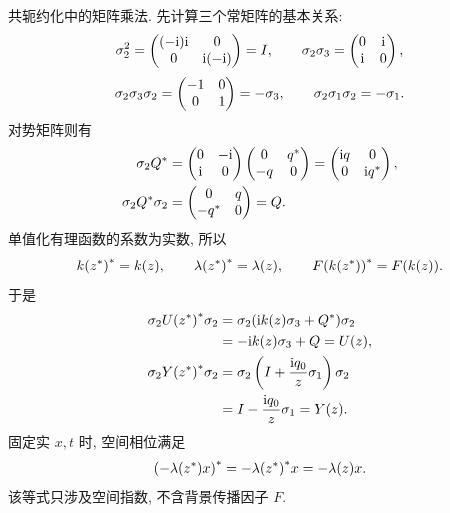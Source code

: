 \par\medskip\noindent 共轭约化中的矩阵乘法.\quad
先计算三个常矩阵的基本关系:
\begin{equation*}
\sigma_2^2
=\begin{pmatrix}(-\mathrm{i})\mathrm{i}&0\\0&\mathrm{i}(-\mathrm{i})\end{pmatrix}=I,
\qquad
\sigma_2\sigma_3
=\begin{pmatrix}0&\mathrm{i}\\\mathrm{i}&0\end{pmatrix},
\end{equation*}
\begin{equation*}
\sigma_2\sigma_3\sigma_2
=\begin{pmatrix}-1&0\\0&1\end{pmatrix}=-\sigma_3,
\qquad
\sigma_2\sigma_1\sigma_2=-\sigma_1.
\end{equation*}
对势矩阵则有
\begin{align*}
\sigma_2{Q}^{*}
&=\begin{pmatrix}0&-\mathrm{i}\\\mathrm{i}&0\end{pmatrix}
\begin{pmatrix}0&{q}^{*}\\-q&0\end{pmatrix}
=\begin{pmatrix}\mathrm{i} q&0\\0&\mathrm{i}{q}^{*}\end{pmatrix},\\
\sigma_2{Q}^{*}\sigma_2
&=\begin{pmatrix}0&q\\-{q}^{*}&0\end{pmatrix}=Q.
\end{align*}
单值化有理函数的系数为实数, 所以
\begin{equation*}
{k({z}^{*})}^{*}=k(z),
\qquad
{\lambda({z}^{*})}^{*}=\lambda(z),
\qquad
{F(k({z}^{*}))}^{*}=F(k(z)).
\end{equation*}
于是
\begin{align*}
\sigma_2{U({z}^{*})}^{*}\sigma_2
&=\sigma_2(\mathrm{i} k(z)\sigma_3+{Q}^{*})\sigma_2\\
&=-\mathrm{i} k(z)\sigma_3+Q=U(z),\\
\sigma_2{Y({z}^{*})}^{*}\sigma_2
&=\sigma_2\left(I+\dfrac{\mathrm{i} q_0}{z}\sigma_1\right)\sigma_2\\
&=I-\dfrac{\mathrm{i} q_0}{z}\sigma_1=Y(z).
\end{align*}
固定实 $x,t$ 时, 空间相位满足
\begin{equation*}
{(-\lambda({z}^{*})x)}^{*}
=-{\lambda({z}^{*})}^{*}x=-\lambda(z)x.
\end{equation*}
该等式只涉及空间指数, 不含背景传播因子 $F$.



